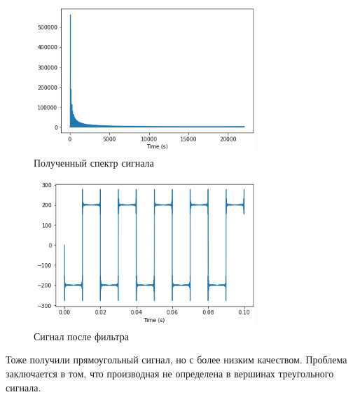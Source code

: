\documentclass[a4paper, 12pt]{report}
\begin{document}
	\begin{figure}[H]
		\centering
		\includegraphics[width=0.75\textwidth]{task3.png}
		\caption{Полученный спектр сигнала}
		\label{fig:task3}
	\end{figure}
	\begin{figure}[H]
		\centering
		\includegraphics[width=0.75\textwidth]{task4.png}
		\caption{Сигнал после фильтра}
		\label{fig:task4}
	\end{figure}
	Тоже получили прямоугольный сигнал, но с более низким качеством. Проблема заключается в том, что производная не определена в вершинах треугольного сигнала.	
\end{document}
